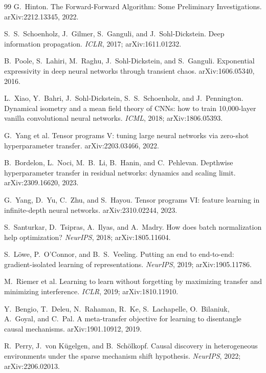 \documentclass[11pt]{article}
\begin{document}
\begin{thebibliography}{99}
 G.~Hinton.
The Forward-Forward Algorithm: Some Preliminary Investigations.
arXiv:2212.13345, 2022.

 S.~S.~Schoenholz, J.~Gilmer, S.~Ganguli, and
J.~Sohl-Dickstein.
Deep information propagation. \emph{ICLR}, 2017; arXiv:1611.01232.

 B.~Poole, S.~Lahiri, M.~Raghu,
J.~Sohl-Dickstein, and S.~Ganguli.
Exponential expressivity in deep neural networks through transient chaos.
arXiv:1606.05340, 2016.

 L.~Xiao, Y.~Bahri, J.~Sohl-Dickstein,
S.~S.~Schoenholz, and J.~Pennington.
Dynamical isometry and a mean field theory of CNNs: how to train
10,000-layer vanilla convolutional neural networks.
\emph{ICML}, 2018; arXiv:1806.05393.

 G.~Yang et al.
Tensor programs V: tuning large neural networks via zero-shot hyperparameter
transfer. arXiv:2203.03466, 2022.

 B.~Bordelon, L.~Noci, M.~B.~Li, B.~Hanin,
and C.~Pehlevan.
Depthwise hyperparameter transfer in residual networks: dynamics and scaling
limit. arXiv:2309.16620, 2023.

 G.~Yang, D.~Yu, C.~Zhu, and S.~Hayou.
Tensor programs VI: feature learning in infinite-depth neural networks.
arXiv:2310.02244, 2023.

 S.~Santurkar, D.~Tsipras, A.~Ilyas, and A.~Madry.
How does batch normalization help optimization?
\emph{NeurIPS}, 2018; arXiv:1805.11604.

 S.~Löwe, P.~O'Connor, and B.~S.~Veeling.
Putting an end to end-to-end: gradient-isolated learning of representations.
\emph{NeurIPS}, 2019; arXiv:1905.11786.

 M.~Riemer et al.
Learning to learn without forgetting by maximizing transfer and minimizing
interference. \emph{ICLR}, 2019; arXiv:1810.11910.

Y.~Bengio, T.~Deleu, N.~Rahaman, R.~Ke, S.~Lachapelle, O.~Bilaniuk,
A.~Goyal, and C.~Pal.
A meta-transfer objective for learning to disentangle causal mechanisms.
arXiv:1901.10912, 2019.

R.~Perry, J.~von K\"ugelgen, and B.~Sch\"olkopf.
Causal discovery in heterogeneous environments under the sparse mechanism
shift hypothesis.
\emph{NeurIPS}, 2022; arXiv:2206.02013.


\end{thebibliography}
\end{document}
